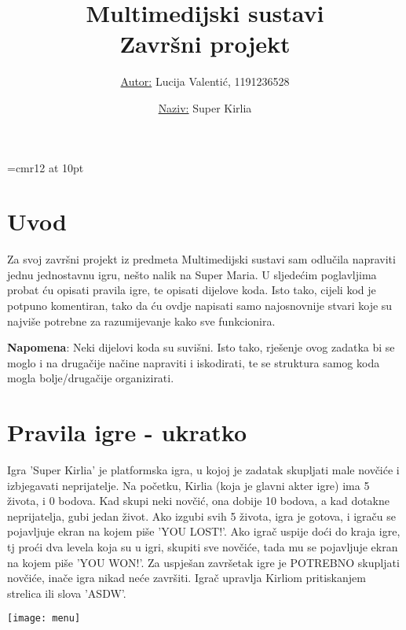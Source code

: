 \documentclass[12pt]{article}
\begin{document}
\title{\textbf{Multimedijski sustavi} \\
\large Završni projekt}
\author{\underline{Autor:} Lucija Valentić, 1191236528 }
\date{\underline{Naziv:} Super Kirlia}

\maketitle
\newpage

\font\myfont=cmr12 at 10pt

\tableofcontents
\newpage

\section{Uvod}
Za svoj završni projekt iz predmeta Multimedijski sustavi sam odlučila napraviti jednu jednostavnu igru, nešto nalik na Super Maria. U sljedećim poglavljima probat ću opisati pravila igre, te opisati dijelove koda. Isto tako, cijeli kod je potpuno komentiran, tako da ću ovdje napisati samo najosnovnije stvari koje su najviše potrebne za razumijevanje kako sve funkcionira. 

\vspace*{\fill}
\textbf{Napomena}: Neki dijelovi koda su suvišni. Isto tako, rješenje ovog zadatka bi se moglo i na drugačije načine napraviti i iskodirati, te se struktura samog koda mogla bolje/drugačije organizirati. 
\newpage

\section{Pravila igre - ukratko}
Igra 'Super Kirlia' je platformska igra, u kojoj je zadatak skupljati male novčiće i izbjegavati neprijatelje. Na početku, Kirlia (koja je glavni akter igre) ima 5 života, i 0 bodova. Kad skupi neki novčić, ona dobije 10 bodova, a kad dotakne neprijatelja, gubi jedan život. Ako izgubi svih 5 života, igra je gotova, i igraču se pojavljuje ekran na kojem piše 'YOU LOST!'. Ako igrač uspije doći do kraja igre, tj proći dva levela koja su u igri, skupiti sve novčiće, tada mu se pojavljuje ekran na kojem piše 'YOU WON!'. Za uspješan završetak igre je POTREBNO skupljati novčiće, inače igra nikad neće završiti. Igrač upravlja Kirliom pritiskanjem strelica ili slova 'ASDW'. 


\hfill
\texttt{[image: menu]}

\newpage
\end{document}
